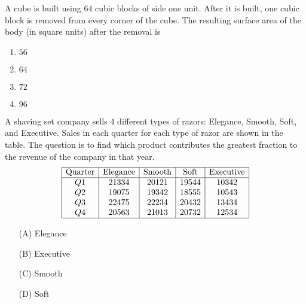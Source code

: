 \item A cube is built using $64$ cubic blocks of side one unit. After it is built, one cubic block is removed from every corner of the cube. The resulting surface area of the body (in square units) after the removal is 
\begin{enumerate}
    \item $56$
    \item $64$
    \item $72$
    \item $96$
\end{enumerate}

\item A shaving set company sells 4 different types of razors: Elegance, Smooth, Soft, and Executive. Sales in each quarter for each type of razor are shown in the table. The question is to find which product contributes the greatest fraction to the revenue of the company in that year.
\[
\begin{array}{|c|c|c|c|c|}
\hline
\text{Quarter} & \text{Elegance} & \text{Smooth} & \text{Soft} & \text{Executive} \\
\hline
Q1 & 21334 & 20121 & 19544 & 10342 \\
Q2 & 19075 & 19342 & 18555 & 10543 \\
Q3 & 22475 & 22234 & 20432 & 13434 \\
Q4 & 20563 & 21013 & 20732 & 12534 \\
\hline
\end{array}
\]
\begin{enumerate}
    \item[(A)] Elegance
    \item[(B)] Executive
    \item[(C)] Smooth
    \item[(D)] Soft
\end{enumerate}

